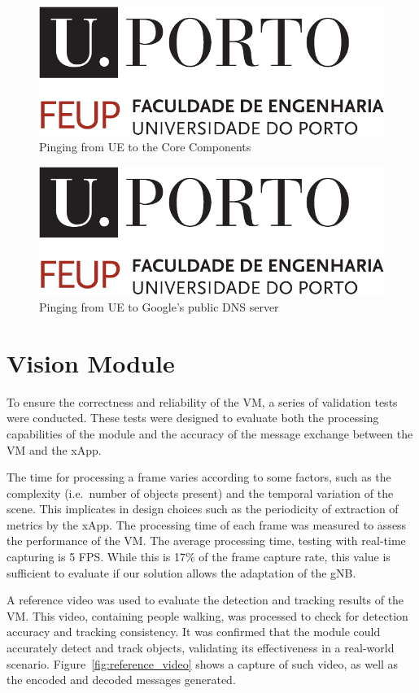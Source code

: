 \begin{figure}[H]
    \centering
    \includegraphics[width=0.5\linewidth]{figures/uporto-feup}
    \caption{Pinging from UE to the Core Components}
    \label{fig:ping_ue_core}
\end{figure}

\begin{figure}[H]
    \centering
    \includegraphics[width=0.5\linewidth]{figures/uporto-feup}
    \caption{Pinging from UE to Google's public DNS server}
    \label{fig:ping_ue_internet}
\end{figure}


\section{Vision Module}\label{sec:cv_module}
To ensure the correctness and reliability of the VM, a series of validation tests were conducted.
These tests were designed to evaluate both the processing capabilities of the module and the accuracy of the message exchange between the VM and the xApp.

The time for processing a frame varies according to some factors, such as the complexity (i.e.\ number of objects present) and the temporal variation of the scene.
This implicates in design choices such as the periodicity of extraction of metrics by the xApp.
The processing time of each frame was measured to assess the performance of the VM\@.
The average processing time, testing with real-time capturing is 5 FPS\@.
While this is 17\% of the frame capture rate, this value is sufficient to evaluate if our solution allows the adaptation of the gNB\@.

A reference video was used to evaluate the detection and tracking results of the VM\@.
This video, containing people walking, was processed to check for detection accuracy and tracking consistency.
It was confirmed that the module could accurately detect and track objects, validating its effectiveness in a real-world scenario.
Figure~\ref{fig:reference_video} shows a capture of such video, as well as the encoded and decoded messages generated.

